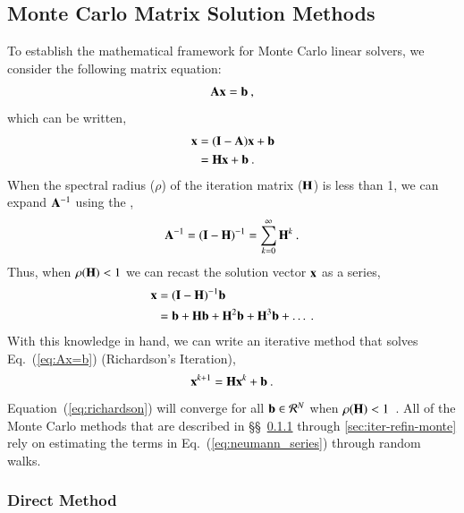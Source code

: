 \documentclass[preprint,12pt]{elsarticle}
\newcommand{\vA}{\ensuremath{\ve{A}}}
\newcommand{\vb}{\ensuremath{\ve{b}}}
\newcommand{\vx}{\ensuremath{\ve{x}}}
\newcommand{\vI}{\ensuremath{\ve{I}}}
\newcommand{\vH}{\ensuremath{\ve{H}}}
\begin{document}
\subsection{Monte Carlo Matrix Solution Methods}
\label{sec:background}
To establish the mathematical framework for Monte Carlo linear
solvers, we consider the following matrix equation:
\begin{equation}
  \vA\vx = \vb\:,
  \label{eq:Ax=b}
\end{equation}
which can be written,
\begin{equation}
  \begin{split}
    \vx &= (\vI - \vA)\vx + \vb\\ &= \vH\vx + \vb\:.
  \end{split}
  \label{eq:point_iteration}
\end{equation}
When the spectral radius ($\rho$) of the iteration matrix ($\vH$) is
less than 1, we can expand $\vA^{-1}$ using the ,
\begin{equation}
  \vA^{-1} = (\vI - \vH)^{-1} = \sum_{k=0}^{\infty} \vH^k\:.
\end{equation} 
Thus, when $\rho(\vH) < 1$ we can recast the solution vector $\vx$ as
a series,
\begin{equation}
  \begin{split}
    \vx &= (\vI - \vH)^{-1}\vb\\ &= \vb + \vH\vb + \vH^2\vb + \vH^3\vb
    + \ldots\:.
    \label{eq:neumann_series}
  \end{split}
\end{equation}
With this knowledge in hand, we can write an iterative method that
solves Eq.~(\ref{eq:Ax=b}) (Richardson's Iteration),
\begin{equation}
  \vx^{k+1} = \vH\vx^k + \vb\:.
  \label{eq:richardson}
\end{equation}
Equation~(\ref{eq:richardson}) will converge for all $\vb \in
\mathcal{R}^{N}$ when $\rho(\vH) < 1$~\cite{kelley_1995}.  All of the
Monte Carlo methods that are described in \S\S~\ref{sec:direct-method}
through \ref{sec:iter-refin-monte} rely on estimating the terms in
Eq.~(\ref{eq:neumann_series}) through random walks.

\subsubsection{Direct Method}
\label{sec:direct-method}
\end{document}
